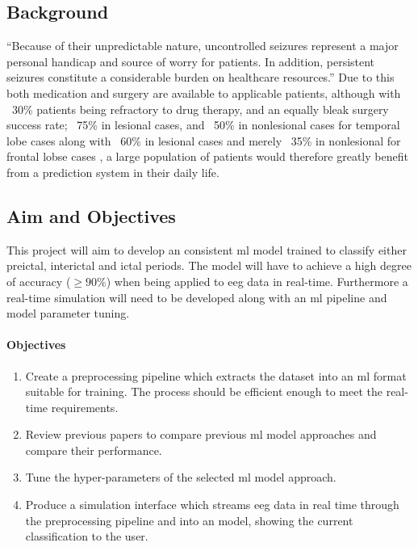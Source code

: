 \documentclass[12pt]{article}
\begin{document}
\subsection{Background}

``Because of their unpredictable nature, uncontrolled seizures represent a major personal handicap and source of worry for patients. In addition, persistent seizures constitute a considerable burden on healthcare resources.'' \cite{assi2017towards} Due to this both medication and surgery are available to applicable patients, although with ~30\% patients being refractory to drug therapy, and an equally bleak surgery success rate; ~75\% in lesional cases, and ~50\% in nonlesional cases for temporal lobe cases along with ~60\% in lesional cases and merely ~35\% in nonlesional for frontal lobse cases \cite{assi2017towards}, a large population of patients would therefore greatly benefit from a prediction system in their daily life. 

\subsection{Aim and Objectives}

This project will aim to develop an consistent \acrshort{ml} model trained to classify either preictal, interictal and ictal periods. The model will have to achieve a high degree of accuracy ($\geq90\%$) when being applied to \acrshort{eeg} data in real-time. Furthermore a real-time simulation will need to be developed along with an \acrshort{ml} pipeline and model parameter tuning. 

 
\paragraph{Objectives}

\begin{enumerate}
        \item Create a preprocessing pipeline which extracts the dataset into an \acrshort{ml} format suitable for training. The process should be efficient enough to meet the real-time requirements. 
        \item Review previous papers to compare previous \acrshort{ml} model approaches and compare their performance.
        \item Tune the hyper-parameters of the selected \acrshort{ml} model approach.
        \item Produce a simulation interface which streams \acrshort{eeg} data in real time through the preprocessing pipeline and into an model, showing the current classification to the user.
\end{enumerate}
\end{document}
